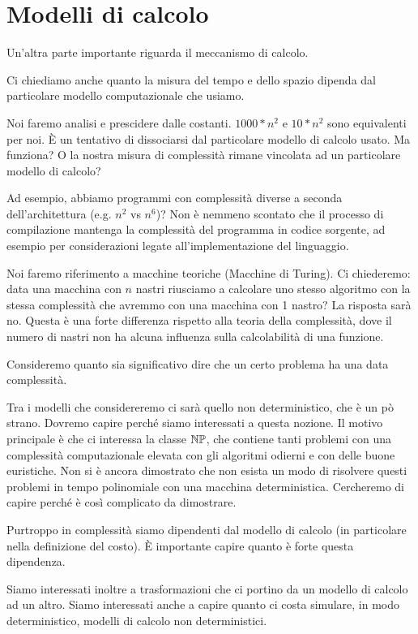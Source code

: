 \section{Modelli di calcolo}

Un'altra parte importante riguarda il meccanismo di calcolo.

Ci chiediamo anche quanto la misura del tempo e dello spazio dipenda dal particolare modello
computazionale che usiamo.

Noi faremo analisi e prescidere dalle costanti. $1000*n^{2}$ e $10*n^{2}$ sono equivalenti per noi.
È un tentativo di dissociarsi dal particolare modello di calcolo usato. Ma funziona? O la nostra
misura di complessità rimane vincolata ad un particolare modello di calcolo?

Ad esempio, abbiamo programmi con complessità diverse a seconda dell'architettura (e.g. $n^{2}$ vs
$n^{6}$)? Non è nemmeno scontato che il processo di compilazione mantenga la
complessità del programma in codice sorgente, ad esempio per considerazioni legate
all'implementazione del linguaggio.

Noi faremo riferimento a macchine teoriche (Macchine di Turing). Ci chiederemo: data una macchina
con $n$ nastri riusciamo a calcolare uno stesso algoritmo con la stessa complessità che avremmo con
una macchina con 1 nastro? La risposta sarà no. Questa è una forte differenza rispetto alla teoria
della complessità, dove il numero di nastri non ha alcuna influenza sulla calcolabilità di una
funzione.

Consideremo quanto sia significativo dire che un certo problema ha una data complessità.

Tra i modelli che considereremo ci sarà quello non deterministico, che è un pò strano. Dovremo
capire perché siamo interessati a questa nozione. Il motivo principale è che ci interessa la
classe $\mathbb{NP}$, che contiene tanti problemi con una complessità computazionale elevata con gli algoritmi
odierni e con delle buone euristiche. Non si è ancora dimostrato che non esista un modo di
risolvere questi problemi in tempo polinomiale con una macchina deterministica. Cercheremo di capire
perché è così complicato da dimostrare.

Purtroppo in complessità siamo dipendenti dal modello di calcolo (in particolare nella definizione
del costo). È importante capire quanto è forte questa dipendenza.

Siamo interessati inoltre a trasformazioni che ci portino da un modello di calcolo ad un altro.
Siamo interessati anche a capire quanto ci costa simulare, in modo deterministico, modelli di
calcolo non deterministici.


